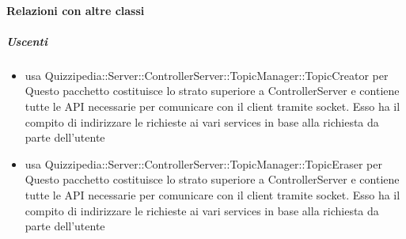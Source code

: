 \paragraph{Relazioni con altre classi}
\subparagraph{Uscenti}
\begin{itemize}
\item usa Quizzipedia::Server::ControllerServer::TopicManager::TopicCreator per Questo pacchetto costituisce lo strato superiore a ControllerServer e contiene tutte le API necessarie per comunicare con il client tramite socket. Esso ha il compito di indirizzare le richieste ai vari services in base alla richiesta da parte dell'utente
\item usa Quizzipedia::Server::ControllerServer::TopicManager::TopicEraser per Questo pacchetto costituisce lo strato superiore a ControllerServer e contiene tutte le API necessarie per comunicare con il client tramite socket. Esso ha il compito di indirizzare le richieste ai vari services in base alla richiesta da parte dell'utente
\end{itemize}
